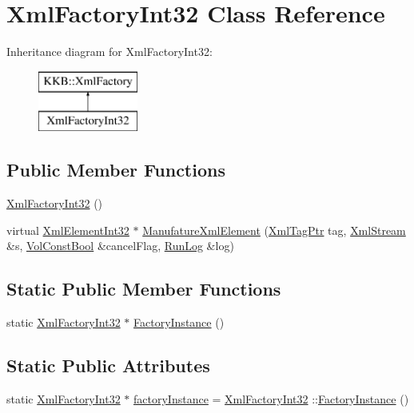 \hypertarget{class_xml_factory_int32}{}\section{Xml\+Factory\+Int32 Class Reference}
\label{class_xml_factory_int32}
Inheritance diagram for Xml\+Factory\+Int32\+:\begin{figure}[H]
\begin{center}
\leavevmode
\includegraphics[height=2.000000cm]{class_xml_factory_int32}
\end{center}
\end{figure}
\subsection*{Public Member Functions}
\begin{DoxyCompactItemize}
\item 
\hyperlink{class_xml_factory_int32_ad7fd908578c89ef8e2e7cff5578a4b10}{Xml\+Factory\+Int32} ()
\item 
virtual \hyperlink{class_k_k_b_1_1_xml_element_int32}{Xml\+Element\+Int32} $\ast$ \hyperlink{class_xml_factory_int32_a538c28f6b038d1352cc34050e0523fe6}{Manufature\+Xml\+Element} (\hyperlink{namespace_k_k_b_a9253a3ea8a5da18ca82be4ca2b390ef0}{Xml\+Tag\+Ptr} tag, \hyperlink{class_k_k_b_1_1_xml_stream}{Xml\+Stream} \&s, \hyperlink{namespace_k_k_b_a7d390f568e2831fb76b86b56c87bf92f}{Vol\+Const\+Bool} \&cancel\+Flag, \hyperlink{class_k_k_b_1_1_run_log}{Run\+Log} \&log)
\end{DoxyCompactItemize}
\subsection*{Static Public Member Functions}
\begin{DoxyCompactItemize}
\item 
static \hyperlink{class_xml_factory_int32}{Xml\+Factory\+Int32} $\ast$ \hyperlink{class_xml_factory_int32_a4c35a8fa186b50650ff348fc56c3f25f}{Factory\+Instance} ()
\end{DoxyCompactItemize}
\subsection*{Static Public Attributes}
\begin{DoxyCompactItemize}
\item 
static \hyperlink{class_xml_factory_int32}{Xml\+Factory\+Int32} $\ast$ \hyperlink{class_xml_factory_int32_ae3d85e3360970334f24232fa6dd290a8}{factory\+Instance} = \hyperlink{class_xml_factory_int32}{Xml\+Factory\+Int32} \+::\hyperlink{class_xml_factory_int32_a4c35a8fa186b50650ff348fc56c3f25f}{Factory\+Instance} ()
\end{DoxyCompactItemize}


